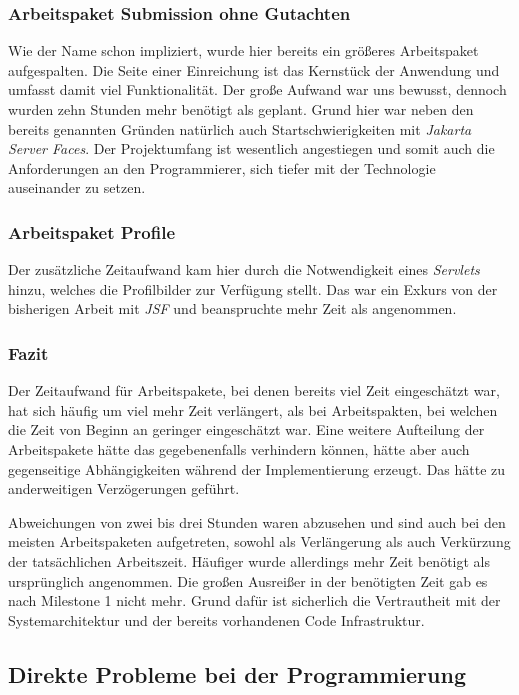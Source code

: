 \subsubsection{Arbeitspaket Submission ohne Gutachten}

Wie der Name schon impliziert, wurde hier bereits ein größeres Arbeitspaket aufgespalten. Die Seite einer Einreichung ist das Kernstück der Anwendung und umfasst damit viel Funktionalität. Der große Aufwand war uns bewusst, dennoch wurden zehn Stunden mehr benötigt als geplant. Grund hier war neben den bereits genannten Gründen natürlich auch Startschwierigkeiten mit  \emph{Jakarta Server Faces}. Der Projektumfang ist wesentlich angestiegen und somit auch die Anforderungen an den Programmierer, sich tiefer mit der Technologie auseinander zu setzen.

\subsubsection{Arbeitspaket Profile}

Der zusätzliche Zeitaufwand kam hier durch die Notwendigkeit eines \emph{Servlets} hinzu, welches die Profilbilder zur Verfügung stellt.
Das war ein Exkurs von der bisherigen Arbeit mit \emph{JSF} und beanspruchte
mehr Zeit als angenommen.

\subsubsection{Fazit}

Der Zeitaufwand für Arbeitspakete, bei denen bereits viel Zeit eingeschätzt war, hat sich häufig um viel mehr Zeit verlängert, als bei Arbeitspakten, bei welchen die Zeit von Beginn an geringer eingeschätzt war. Eine weitere Aufteilung der Arbeitspakete hätte das gegebenenfalls verhindern können, hätte aber auch gegenseitige Abhängigkeiten während der Implementierung erzeugt. Das hätte zu anderweitigen Verzögerungen geführt.

Abweichungen von zwei bis drei Stunden waren abzusehen und sind auch bei den meisten Arbeitspaketen aufgetreten, sowohl als Verlängerung als auch Verkürzung der tatsächlichen Arbeitszeit. Häufiger wurde allerdings mehr Zeit benötigt als ursprünglich angenommen. Die großen Ausreißer in der benötigten Zeit gab es nach Milestone 1 nicht mehr. Grund dafür ist sicherlich die Vertrautheit mit der
Systemarchitektur und der bereits vorhandenen Code Infrastruktur.

\subsection{Direkte Probleme bei der Programmierung}

